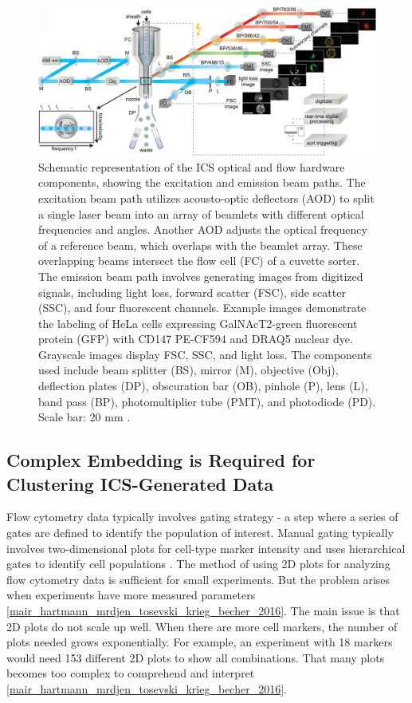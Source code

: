 \documentclass[12pt,a4paper]{article}
\begin{document}
\begin{figure}
  \centering
  \includegraphics[width=\textwidth]{Figures/ICS_working.png}
  \caption{Schematic representation of the ICS optical and flow hardware components, showing the excitation and emission beam paths. The excitation beam path utilizes acousto-optic deflectors (AOD) to split a single laser beam into an array of beamlets with different optical frequencies and angles. Another AOD adjusts the optical frequency of a reference beam, which overlaps with the beamlet array. These overlapping beams intersect the flow cell (FC) of a cuvette sorter. The emission beam path involves generating images from digitized signals, including light loss, forward scatter (FSC), side scatter (SSC), and four fluorescent channels. Example images demonstrate the labeling of HeLa cells expressing GalNAcT2-green fluorescent protein (GFP) with CD147 PE-CF594 and DRAQ5 nuclear dye. Grayscale images display FSC, SSC, and light loss. The components used include beam splitter (BS), mirror (M), objective (Obj), deflection plates (DP), obscuration bar (OB), pinhole (P), lens (L), band pass (BP), photomultiplier tube (PMT), and photodiode (PD). Scale bar: 20 mm \cite{doi:10.1126/science.abj3013}.}
  \label{icsworking}
\end{figure}



\subsection{Complex Embedding is Required for Clustering ICS-Generated Data}
Flow cytometry data typically involves gating strategy - a step where a series of gates are defined to identify the population of interest. Manual gating typically involves two-dimensional plots for cell-type marker intensity and uses hierarchical gates to identify cell populations \cite{10.3389/fimmu.2021.787574}. The method of using 2D plots for analyzing flow cytometry data is sufficient for small experiments. But the problem arises when experiments have more measured parameters \ref{mair_hartmann_mrdjen_tosevski_krieg_becher_2016}. The main issue is that 2D plots do not scale up well. When there are more cell markers, the number of plots needed grows exponentially. For example, an experiment with 18 markers would need 153 different 2D plots to show all combinations. That many plots becomes too complex to comprehend and interpret \ref{mair_hartmann_mrdjen_tosevski_krieg_becher_2016}.
\end{document}
